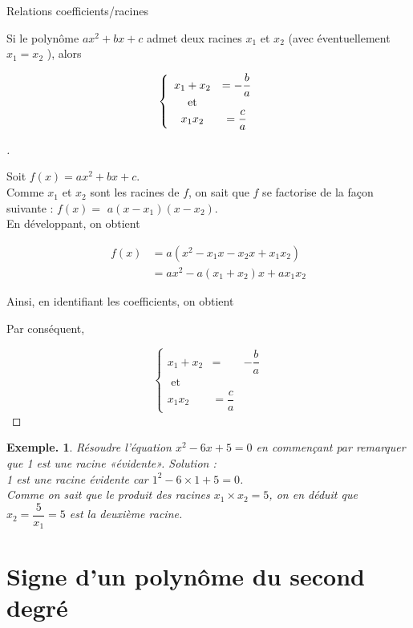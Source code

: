\documentclass[12pt]{article}
\theoremstyle{break}
\newtheorem*{example}{Exemple.}
\newenvironment{demo}[1][\proofname]{%
  \begin{proof}[#1]$ $\newline
}{%
  \end{proof}
}
\begin{document}
\begin{proposition}{Relations coefficients/racines}{}
    
Si le polynôme $a x^{2}+b x+c$ admet deux racines $x_{1}$ et $x_{2}$ (avec éventuellement $x_{1}=x_{2}$ ), alors

$$
\left\{\begin{array}{cc}
x_{1}+x_{2} & =-\dfrac{b}{a} \\
\text { et } & \\
x_{1} x_{2} & =\dfrac{c}{a}
\end{array}\right.
$$
\end{proposition}
\begin{demo}
Soit $f(x)=a x^{2}+b x+c$.\\
Comme $x_{1}$ et $x_{2}$ sont les racines de $f$, on sait que $f$ se factorise de la façon suivante : $f(x)=$ $a\left(x-x_{1}\right)\left(x-x_{2}\right)$.\\
En développant, on obtient

$$
\begin{aligned}
f(x) & =a\left(x^{2}-x_{1} x-x_{2} x+x_{1} x_{2}\right) \\
& =a x^{2}-a\left(x_{1}+x_{2}\right) x+a x_{1} x_{2}
\end{aligned}
$$

Ainsi, en identifiant les coefficients, on obtient

Par conséquent,

$$
\left\{\begin{array}{ccc}
x_{1}+x_{2} & = & -\dfrac{b}{a} \\
\text { et } & \\
x_{1} x_{2} & =\dfrac{c}{a}
\end{array}\right.
$$
\end{demo}

\begin{example}
Résoudre l'équation $x^{2}-6 x+5=0$ en commençant par remarquer que 1 est une racine «évidente».
Solution :\\
1 est une racine évidente car $1^{2}-6 \times 1+5=0$.\\
Comme on sait que le produit des racines $x_{1} \times x_{2}=5$, on en déduit que $x_{2}=\dfrac{5}{x_{1}}=5$ est la deuxième racine.
\end{example}

\newpage
\section{Signe d'un polynôme du second degré}
\end{document}
